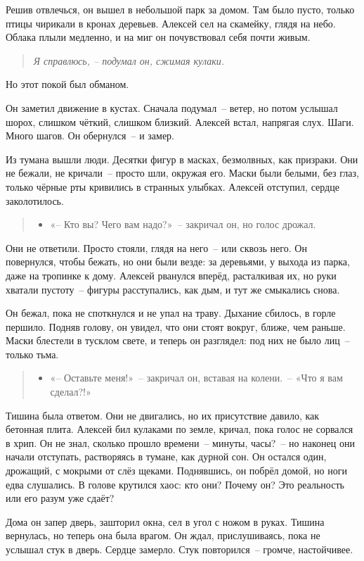 \documentclass[12pt,a4paper]{book}
\newenvironment{dialogue}{\begin{quote}\itshape\begin{itemize}\item[]}{\end{itemize}\end{quote}}
\newenvironment{innerthought}{\begin{quote}\small\itshape}{\end{quote}}
\begin{document}
Решив отвлечься, он вышел в небольшой парк за домом. Там было пусто, только птицы чирикали в кронах деревьев. Алексей сел на скамейку, глядя на небо. Облака плыли медленно, и на миг он почувствовал себя почти живым. 
\begin{innerthought}
    Я справлюсь, -- подумал он, сжимая кулаки.
\end{innerthought}

Но этот покой был обманом.

Он заметил движение в кустах. Сначала подумал~-- ветер, но потом услышал шорох, слишком чёткий, слишком близкий. Алексей встал, напрягая слух. Шаги. Много шагов. Он обернулся~-- и замер.

Из тумана вышли люди. Десятки фигур в масках, безмолвных, как призраки. Они не бежали, не кричали~-- просто шли, окружая его. Маски были белыми, без глаз, только чёрные рты кривились в странных улыбках. Алексей отступил, сердце заколотилось.

\begin{dialogue}
«-- Кто вы? Чего вам надо?»~-- закричал он, но голос дрожал.
\end{dialogue}

Они не ответили. Просто стояли, глядя на него~-- или сквозь него. Он повернулся, чтобы бежать, но они были везде: за деревьями, у выхода из парка, даже на тропинке к дому. Алексей рванулся вперёд, расталкивая их, но руки хватали пустоту~-- фигуры расступались, как дым, и тут же смыкались снова.

Он бежал, пока не споткнулся и не упал на траву. Дыхание сбилось, в горле першило. Подняв голову, он увидел, что они стоят вокруг, ближе, чем раньше. Маски блестели в тусклом свете, и теперь он разглядел: под них не было лиц~-- только тьма.

\begin{dialogue}
«-- Оставьте меня!»~-- закричал он, вставая на колени.~-- «Что я вам сделал?!»
\end{dialogue}

Тишина была ответом. Они не двигались, но их присутствие давило, как бетонная плита. Алексей бил кулаками по земле, кричал, пока голос не сорвался в хрип. Он не знал, сколько прошло времени~-- минуты, часы?~-- но наконец они начали отступать, растворяясь в тумане, как дурной сон.
Он остался один, дрожащий, с мокрыми от слёз щеками. Поднявшись, он побрёл домой, но ноги едва слушались. В голове крутился хаос: кто они? Почему он? Это реальность или его разум уже сдаёт?

Дома он запер дверь, зашторил окна, сел в угол с ножом в руках. Тишина вернулась, но теперь она была врагом. Он ждал, прислушиваясь, пока не услышал стук в дверь. Сердце замерло. Стук повторился~-- громче, настойчивее.
\end{document}
